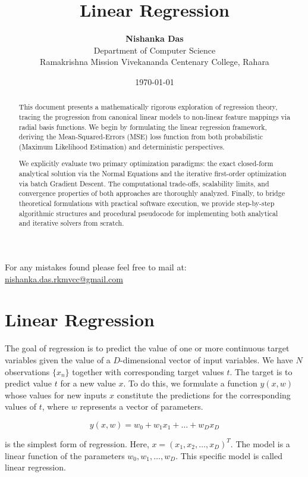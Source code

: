 \documentclass[11pt,a4paper]{article}
\title{\textbf{Linear Regression}}
\author{\textbf{Nishanka Das} \\ 
Department of Computer Science \\ 
Ramakrishna Mission Vivekananda Centenary College, Rahara}
\date{\today}
\begin{document}
\maketitle

\begin{center}
For any mistakes found please feel free to mail at: \\
\url{nishanka.das.rkmvcc@gmail.com}
\end{center}

\begin{abstract}
This document presents a mathematically rigorous exploration of regression theory, tracing the progression from canonical linear models to non-linear feature mappings via radial basis functions. We begin by formulating the linear regression framework, deriving the Mean-Squared-Errors (MSE) loss function from both probabilistic (Maximum Likelihood Estimation) and deterministic perspectives. 

We explicitly evaluate two primary optimization paradigms: the exact closed-form analytical solution via the Normal Equations and the iterative first-order optimization via batch Gradient Descent. The computational trade-offs, scalability limits, and convergence properties of both approaches are thoroughly analyzed. Finally, to bridge theoretical formulations with practical software execution, we provide step-by-step algorithmic structures and procedural pseudocode for implementing both analytical and iterative solvers from scratch.
\end{abstract}

\section{Linear Regression}

The goal of regression is to predict the value of one or more continuous target variables given the value of a $D$-dimensional vector of input variables. We have $N$ observations $\{x_n\}$ together with corresponding target values $t$. The target is to predict value $t$ for a new value $x$. To do this, we formulate a function $y(x, w)$ whose values for new inputs $x$ constitute the predictions for the corresponding values of $t$, where $w$ represents a vector of parameters.

\begin{equation}
y(x, w) = w_0 + w_1 x_1 + \dots + w_D x_D
\end{equation}

is the simplest form of regression. Here, $x = (x_1, x_2, \dots, x_D)^T$. The model is a linear function of the parameters $w_0, w_1, \dots, w_D$. This specific model is called linear regression.
\end{document}

